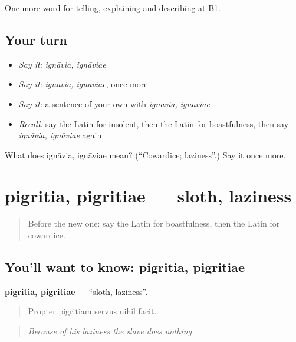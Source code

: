 \begin{grammarlens}[title={What you've built}]
One more word for telling, explaining and describing at B1.
\end{grammarlens}

\subsection*{Your turn}
\begin{itemize}
\raggedright
  \item \emph{Say it:} \emph{ignāvia, ignāviae}
  \item \emph{Say it:} \emph{ignāvia, ignāviae}, once more
  \item \emph{Say it:} a sentence of your own with \emph{ignāvia, ignāviae}
  \item \emph{Recall:} say the Latin for insolent, then the Latin for boastfulness, then say \emph{ignāvia, ignāviae} again
\end{itemize}

\begin{tcolorbox}[breakable,colback=teal!4,colframe=teal!35!black,title={Before you move on}]
What does ignāvia, ignāviae mean? (\textquotedblleft{}Cowardice; laziness\textquotedblright{}.) Say it once more.
\end{tcolorbox}
\section[pigritia, pigritiae]{pigritia, pigritiae — sloth, laziness}

\label{lesson:LA-C508-pigritia}



\begin{quote}
Before the new one: say the Latin for boastfulness, then the Latin for cowardice.
\end{quote}

\subsection*{You'll want to know: pigritia, pigritiae}
\textbf{pigritia, pigritiae} — \textquotedblleft{}sloth, laziness\textquotedblright{}.

\begin{quote}
Propter pigritiam servus nihil facit.
\end{quote}

\begin{quote}
\emph{Because of his laziness the slave does nothing.}
\end{quote}

